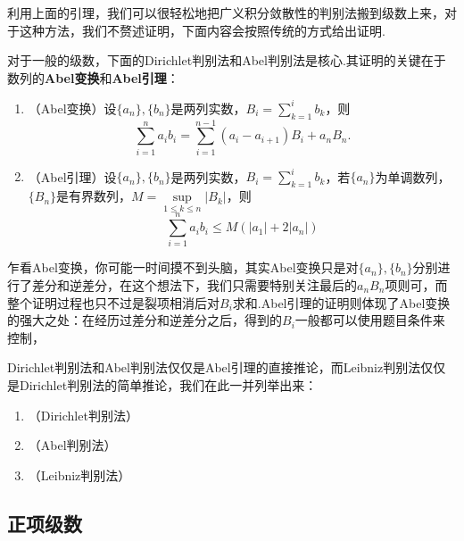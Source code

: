     利用上面的引理，我们可以很轻松地把广义积分敛散性的判别法搬到级数上来，对于这种方法，我们不赘述证明，下面内容会按照传统的方式给出证明.

    对于一般的级数，下面的Dirichlet判别法和Abel判别法是核心.其证明的关键在于数列的\textbf{Abel变换}和\textbf{Abel引理}：
    \begin{lemma}
        \begin{enumerate}
            \item （Abel变换）设\(\{a_n\},\{b_n\}\)是两列实数，\(B_i=\sum\limits_{k=1}^{i}b_k\)，则\[\sum_{i=1}^{n}a_ib_i=\sum_{i=1}^{n-1}(a_i-a_{i+1})B_i+a_nB_n.\]
            \item （Abel引理）设\(\{a_n\},\{b_n\}\)是两列实数，\(B_i=\sum\limits_{k=1}^{i}b_k\)，若\(\{a_n\}\)为单调数列，\(\{B_n\}\)是有界数列，\(M=\sup\limits_{1\leq k\leq n}\vert B_k\vert\)，则\[\sum_{i=1}^{n}a_ib_i\leq M(\vert a_1\vert+2\vert a_n\vert)\]
        \end{enumerate}
    \end{lemma}

    乍看Abel变换，你可能一时间摸不到头脑，其实Abel变换只是对\(\{a_n\},\{b_n\}\)分别进行了差分和逆差分，在这个想法下，我们只需要特别关注最后的\(a_nB_n\)项则可，而整个证明过程也只不过是裂项相消后对\(B_i\)求和.Abel引理的证明则体现了Abel变换的强大之处：在经历过差分和逆差分之后，得到的\(B_i\)一般都可以使用题目条件来控制，

    Dirichlet判别法和Abel判别法仅仅是Abel引理的直接推论，而Leibniz判别法仅仅是Dirichlet判别法的简单推论，我们在此一并列举出来：

    \begin{theorem}
        \begin{enumerate}
            \item （Dirichlet判别法）
            \item （Abel判别法）
            \item （Leibniz判别法）
        \end{enumerate}
    \end{theorem}
    \subsection{正项级数}
    \begin{theorem}[基本判别法]
        
    \end{theorem}
    \begin{theorem}[比较判别法]
        
    \end{theorem}
    \begin{theorem}[积分判别法]
        
    \end{theorem}
    \begin{theorem}[Kummer判别法]
        
    \end{theorem}

